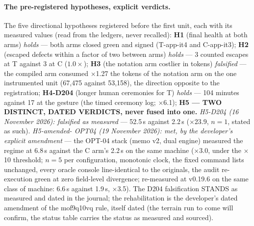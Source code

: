 \documentclass[10pt,a4paper]{article}
\begin{document}
\paragraph{The pre-registered hypotheses, explicit verdicts.} The five
directional hypotheses registered before the first unit, each with its
measured values (read from the ledgers, never recalled): \textbf{H1}
(final health at both arms) \emph{holds} --- both arms closed green
and signed (T-app-it4 and C-app-it3); \textbf{H2} (escaped defects
within a factor of two between arms) \emph{holds} --- 3 counted
escapes at T against 3 at C ($1.0\times$); \textbf{H3} (the notation
arm costlier in tokens) \emph{falsified} --- the compiled arm consumed
$\times$1.27 the tokens of the notation arm on the one instrumented
unit (67{,}475 against 53{,}158), the direction opposite to the
registration; \textbf{H4-D204} (longer human ceremonies for T)
\emph{holds} --- 104 minutes against 17 at the gesture (the timed
ceremony log; $\times$6.1); \textbf{H5 --- TWO DISTINCT, DATED VERDICTS, never fused into one.}
\emph{H5-D204 (16 November 2026): falsified as measured} --- 52.5\,s
against 2.2\,s ($\times$23.9, $n{=}1$, stated as such). \emph{H5-amended-
OPT04 (19 November 2026): met, by the developer's explicit amendment}
--- the OPT-04 stack (memo v2, dual engine) measured the regime at
6.8\,s against the C arm's 2.2\,s on the same machine ($\times$3.0,
under the $\times$10 threshold; $n{=}5$ per configuration, monotonic
clock, the fixed command lists unchanged, every oracle console
line-identical to the originals, the audit re-execution green at zero
field-level divergence; re-measured at v0.19.6 on the same class of
machine: 6.6\,s against 1.9\,s, $\times$3.5). The D204 falsification
STANDS as measured and dated in the journal; the rehabilitation is
the developer's dated amendment of the mof9q10vq rule, itself dated
(the terrain run to come will confirm, the status table
carries the status as measured and sourced).
\end{document}
